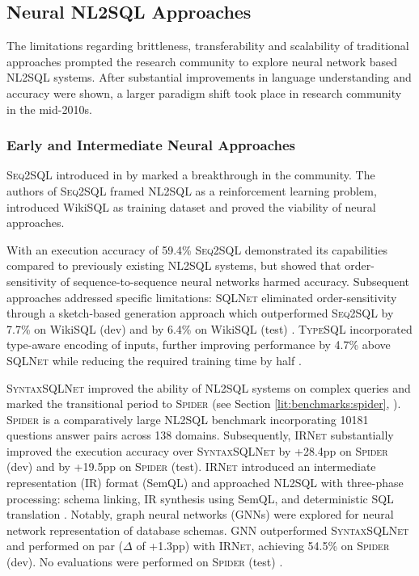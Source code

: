 \subsection{Neural NL2SQL Approaches}

The limitations regarding brittleness, transferability and scalability
of traditional approaches prompted the research community to explore
neural network based NL2SQL systems. After substantial improvements in language
understanding and accuracy were shown, a larger paradigm shift took place in
research community in the mid-2010s.

\subsubsection{Early and Intermediate Neural Approaches}

\textsc{Seq2SQL} introduced in \citeyear{Seq2SQL} by \citeauthor{Seq2SQL}
marked a breakthrough in the community. The authors of \textsc{Seq2SQL} framed
NL2SQL as a reinforcement learning problem, introduced WikiSQL as training
dataset and proved the viability of neural approaches.

With an execution accuracy of 59.4\% \textsc{Seq2SQL} demonstrated its
capabilities compared to previously existing NL2SQL systems, but showed that
order-sensitivity of sequence-to-sequence neural networks harmed accuracy. 
Subsequent approaches addressed specific limitations: \textsc{SQLNet}
eliminated order-sensitivity through a sketch-based generation approach which
outperformed \textsc{Seq2SQL} by 7.7\% on WikiSQL (dev) and by 6.4\% on WikiSQL
(test) \citep{SQLNet}. \textsc{TypeSQL} incorporated type-aware encoding of
inputs, further improving performance by 4.7\% above \textsc{SQLNet} while
reducing the required training time by half \citep{TypeSQL}. 

\textsc{SyntaxSQLNet} improved the ability of NL2SQL systems on complex
queries and marked the transitional period to \textsc{Spider} (see Section
\ref{lit:benchmarks:spider}, \cite{Spider}). \textsc{Spider} is a comparatively
large NL2SQL benchmark incorporating 10181 questions answer pairs across 138
domains. Subsequently, \textsc{IRNet} substantially improved the execution
accuracy over \textsc{SyntaxSQLNet} by +28.4pp on \textsc{Spider} (dev) and by
+19.5pp on \textsc{Spider} (test). \textsc{IRNet} introduced an intermediate
representation (IR) format (SemQL) and approached NL2SQL with three-phase
processing: schema linking, IR synthesis using SemQL, and deterministic SQL
translation \citep{IRNet}. Notably, graph neural networks (GNNs) were explored
for neural network representation of database schemas. \textsc{GNN}
outperformed \textsc{SyntaxSQLNet} and performed on par ($\Delta$ of +1.3pp)
with \textsc{IRNet}, achieving 54.5\% on \textsc{Spider} (dev). No evaluations
were performed on \textsc{Spider} (test) \citep{GNN}.

